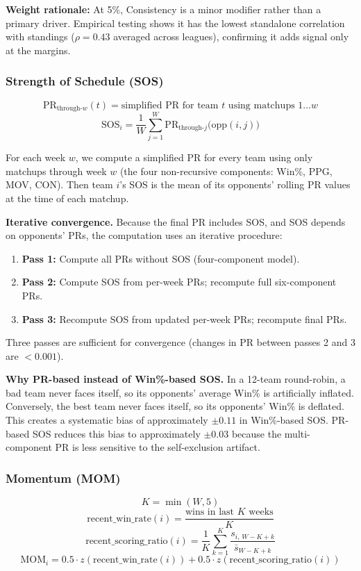 \documentclass[11pt,a4paper]{article}
\begin{document}
\textbf{Weight rationale:} At 5\%, Consistency is a minor modifier rather than a primary driver. Empirical testing shows it has the lowest standalone correlation with standings ($\rho = 0.43$ averaged across leagues), confirming it adds signal only at the margins.

\subsubsection{Strength of Schedule (SOS)}
\[
\text{PR}_{\text{through-}w}(t) = \text{simplified PR for team } t \text{ using matchups } 1 \ldots w
\]
\[
\text{SOS}_i = \frac{1}{W} \sum_{j=1}^{W} \text{PR}_{\text{through-}j}\bigl(\text{opp}(i,j)\bigr)
\]

For each week $w$, we compute a simplified PR for every team using only matchups through week $w$ (the four non-recursive components: Win\%, PPG, MOV, CON). Then team $i$'s SOS is the mean of its opponents' rolling PR values at the time of each matchup.

\textbf{Iterative convergence.} Because the final PR includes SOS, and SOS depends on opponents' PRs, the computation uses an iterative procedure:
\begin{enumerate}[nosep]
\item \textbf{Pass 1:} Compute all PRs without SOS (four-component model).
\item \textbf{Pass 2:} Compute SOS from per-week PRs; recompute full six-component PRs.
\item \textbf{Pass 3:} Recompute SOS from updated per-week PRs; recompute final PRs.
\end{enumerate}
Three passes are sufficient for convergence (changes in PR between passes 2 and 3 are $< 0.001$).

\textbf{Why PR-based instead of Win\%-based SOS.} In a 12-team round-robin, a bad team never faces itself, so its opponents' average Win\% is artificially inflated. Conversely, the best team never faces itself, so its opponents' Win\% is deflated. This creates a systematic bias of approximately $\pm 0.11$ in Win\%-based SOS. PR-based SOS reduces this bias to approximately $\pm 0.03$ because the multi-component PR is less sensitive to the self-exclusion artifact.

\subsubsection{Momentum (MOM)}
\[
K = \min(W, 5)
\]
\[
\text{recent\_win\_rate}(i) = \frac{\text{wins in last } K \text{ weeks}}{K}
\]
\[
\text{recent\_scoring\_ratio}(i) = \frac{1}{K} \sum_{k=1}^{K} \frac{s_{i,\, W-K+k}}{\bar{s}_{W-K+k}}
\]
\[
\text{MOM}_i = 0.5 \cdot z(\text{recent\_win\_rate}(i)) + 0.5 \cdot z(\text{recent\_scoring\_ratio}(i))
\]
\end{document}
